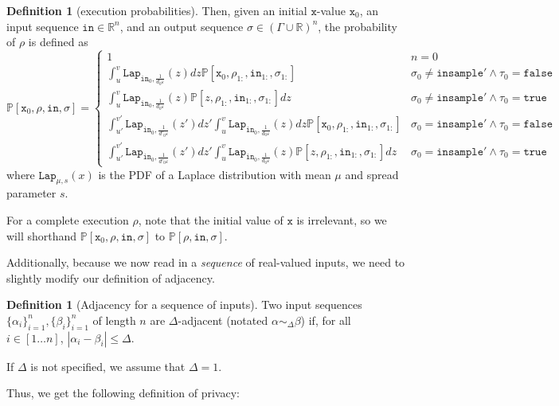 \documentclass[12pt]{article}
\newcommand{\RR}{\mathbb{R}}
\newcommand{\PP}{\mathbb{P}}
\newcommand{\Lap}{\texttt{Lap}}
\theoremstyle{definition}
\newtheorem{defn}[thm]{Definition}
\begin{document}
\begin{defn}[execution probabilities]
    Then, given an initial $\texttt{x}$-value $\texttt{x}_0$, an input sequence $\texttt{in}\in \RR^n$, and an output sequence $\sigma\in (\Gamma\cup\RR)^n$, the probability of $\rho$ is defined as \[
        \PP[\texttt{x}_0, \rho, \texttt{in}, \sigma] = \begin{cases}
            1 & n = 0\\
            \int_u^v \Lap_{\texttt{in}_0, \frac{1}{d_0\varepsilon}}(z)dz\PP[\texttt{x}_0, \rho_{1:}, \texttt{in}_{1:}, \sigma_{1:}] & \sigma_0 \neq \texttt{insample}' \land \tau_0 = \texttt{false}\\
            \int_u^v \Lap_{\texttt{in}_0, \frac{1}{d_0\varepsilon}}(z)\PP[z, \rho_{1:}, \texttt{in}_{1:}, \sigma_{1:}]dz  & \sigma_0 \neq \texttt{insample}'\land \tau_0=\texttt{true} \\
            \int_{u'}^{v'}\Lap_{\texttt{in}_0, \frac{1}{d'_0\varepsilon}}(z')dz'\int_u^v \Lap_{\texttt{in}_0, \frac{1}{d_0\varepsilon}}(z)dz\PP[\texttt{x}_0, \rho_{1:}, \texttt{in}_{1:}, \sigma_{1:}]& \sigma_0 = \texttt{insample}'\land \tau_0 = \texttt{false}\\
            \int_{u'}^{v'}\Lap_{\texttt{in}_0, \frac{1}{d'_0\varepsilon}}(z')dz'\int_u^v \Lap_{\texttt{in}_0, \frac{1}{d_0\varepsilon}}(z)\PP[z, \rho_{1:}, \texttt{in}_{1:}, \sigma_{1:}]dz& \sigma_0 = \texttt{insample}'\land \tau_0 = \texttt{true}
        \end{cases}
    \]
    where $\Lap_{\mu, s}(x)$ is the PDF of a Laplace distribution with mean $\mu$ and spread parameter $s$.
\end{defn}

For a complete execution $\rho$, note that the initial value of $\texttt{x}$ is irrelevant, so we will shorthand $\PP[\texttt{x}_0, \rho, \texttt{in}, \sigma]$ to $\PP[\rho, \texttt{in}, \sigma]$.

Additionally, because we now read in a \textit{sequence} of real-valued inputs, we need to slightly modify our definition of adjacency.

\begin{defn}[Adjacency for a sequence of inputs]
    Two input sequences $\{\alpha_i\}_{i=1}^n, \{\beta_i\}_{i=1}^n$ of length $n$ are $\Delta$-adjacent (notated $\alpha \sim_{\Delta}\beta$) if, for all $i\in [1\ldots n]$, $|\alpha_i-\beta_i|\leq \Delta$. 

    If $\Delta$ is not specified, we assume that $\Delta = 1$. 
\end{defn}

Thus, we get the following definition of privacy:
\end{document}
